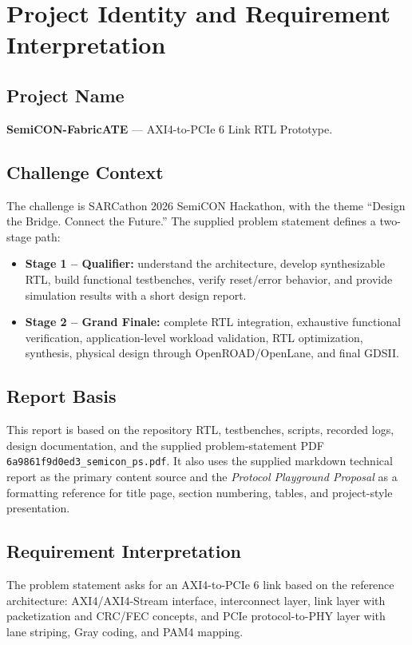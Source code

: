 \documentclass[11pt,a4paper]{article}
\newcommand{\code}[1]{\texttt{#1}}
\begin{document}
\section{Project Identity and Requirement Interpretation}

\subsection{Project Name}
\textbf{SemiCON-FabricATE} --- AXI4-to-PCIe 6 Link RTL Prototype.

\subsection{Challenge Context}
The challenge is SARCathon 2026 SemiCON Hackathon, with the theme
``Design the Bridge. Connect the Future.'' The supplied problem statement defines a
two-stage path:

\begin{itemize}[leftmargin=*]
    \item \textbf{Stage 1 -- Qualifier:} understand the architecture, develop synthesizable
    RTL, build functional testbenches, verify reset/error behavior, and provide simulation
    results with a short design report.
    \item \textbf{Stage 2 -- Grand Finale:} complete RTL integration, exhaustive functional
    verification, application-level workload validation, RTL optimization, synthesis,
    physical design through OpenROAD/OpenLane, and final GDSII.
\end{itemize}

\subsection{Report Basis}
This report is based on the repository RTL, testbenches, scripts, recorded logs, design
documentation, and the supplied problem-statement PDF
\code{6a9861f9d0ed3\_semicon\_ps.pdf}. It also uses the supplied markdown technical report
as the primary content source and the \emph{Protocol Playground Proposal} as a formatting
reference for title page, section numbering, tables, and project-style presentation.

\subsection{Requirement Interpretation}
The problem statement asks for an AXI4-to-PCIe 6 link based on the reference architecture:
AXI4/AXI4-Stream interface, interconnect layer, link layer with packetization and
CRC/FEC concepts, and PCIe protocol-to-PHY layer with lane striping, Gray coding, and
PAM4 mapping.
\end{document}
